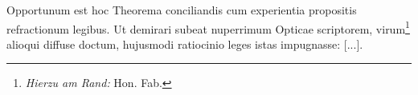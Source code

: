  \pstart [p.~26] Opportunum est hoc Theorema conciliandis cum experientia propositis refractionum legibus\protect{}. Ut demirari subeat nuperrimum Opticae scriptorem, virum\footnote{\textit{Hierzu am Rand:} Hon. Fab.\protect{}} alioqui diffuse doctum, hujusmodi ratiocinio leges istas impugnasse: [...].
 \pend